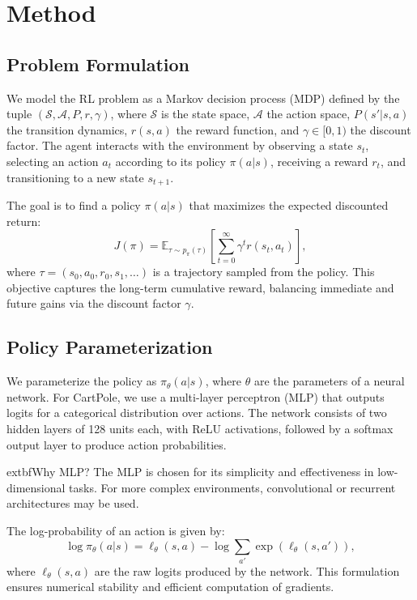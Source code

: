 \documentclass[conference]{IEEEtran}
\begin{document}
\section{Method}
\label{sec:method}


\subsection{Problem Formulation}

We model the RL problem as a Markov decision process (MDP) defined by the tuple $(\mathcal{S}, \mathcal{A}, P, r, \gamma)$, where $\mathcal{S}$ is the state space, $\mathcal{A}$ the action space, $P(s'|s,a)$ the transition dynamics, $r(s,a)$ the reward function, and $\gamma \in [0,1)$ the discount factor. The agent interacts with the environment by observing a state $s_t$, selecting an action $a_t$ according to its policy $\pi(a|s)$, receiving a reward $r_t$, and transitioning to a new state $s_{t+1}$.

The goal is to find a policy $\pi(a|s)$ that maximizes the expected discounted return:
\[
J(\pi) = \mathbb{E}_{\tau \sim p_\pi(\tau)} \left[ \sum_{t=0}^\infty \gamma^t r(s_t, a_t) \right],
\]
where $\tau = (s_0, a_0, r_0, s_1, \dots)$ is a trajectory sampled from the policy. This objective captures the long-term cumulative reward, balancing immediate and future gains via the discount factor $\gamma$.

\subsection{Policy Parameterization}


We parameterize the policy as $\pi_\theta(a|s)$, where $\theta$ are the parameters of a neural network. For CartPole, we use a multi-layer perceptron (MLP) that outputs logits for a categorical distribution over actions. The network consists of two hidden layers of 128 units each, with ReLU activations, followed by a softmax output layer to produce action probabilities.

	extbf{Why MLP?} The MLP is chosen for its simplicity and effectiveness in low-dimensional tasks. For more complex environments, convolutional or recurrent architectures may be used.

The log-probability of an action is given by:
\[
\log \pi_\theta(a|s) = \ell_\theta(s,a) - \log \sum_{a'} \exp(\ell_\theta(s,a')),
\]
where $\ell_\theta(s,a)$ are the raw logits produced by the network. This formulation ensures numerical stability and efficient computation of gradients.
\end{document}
